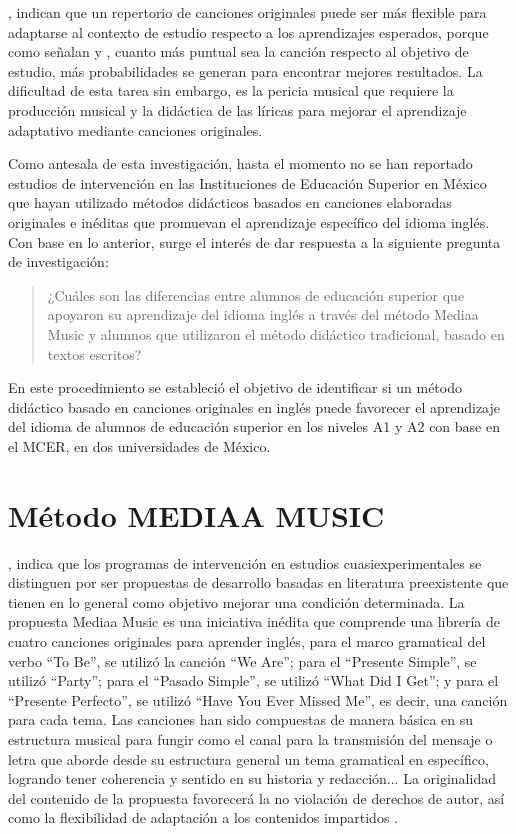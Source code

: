 \documentclass[spanish]{textolivre}
\begin{document}
\textcite{lestari2020vocabulary}, indican que un repertorio de canciones originales puede ser más flexible para adaptarse al contexto de estudio respecto a los aprendizajes esperados, porque como señalan \textcite{hafting2018benefits} y \textcite{hakvoort2022music}, cuanto más puntual sea la canción respecto al objetivo de estudio, más probabilidades se generan para encontrar mejores resultados. La dificultad de esta tarea sin embargo, es la pericia musical que requiere la producción musical y la didáctica de las líricas para mejorar el aprendizaje adaptativo mediante canciones originales.

Como antesala de esta investigación, hasta el momento no se han reportado estudios de intervención en las Instituciones de Educación Superior en México que hayan utilizado métodos didácticos basados en canciones elaboradas originales e inéditas que promuevan el aprendizaje específico del idioma inglés. Con base en lo anterior, surge el interés de dar respuesta a la siguiente pregunta de investigación:

\begin{quote}
 ¿Cuáles son las diferencias entre alumnos de educación superior que apoyaron su aprendizaje del idioma inglés a través del método Mediaa Music y alumnos que utilizaron el método didáctico tradicional, basado en textos escritos?
\end{quote}

En este procedimiento se estableció el objetivo de identificar si un método didáctico basado en canciones originales en inglés puede favorecer el aprendizaje del idioma de alumnos de educación superior en los niveles A1 y A2 con base en el MCER, en dos universidades de México.





\section{Método MEDIAA MUSIC}

\textcite{ledezmaalbarran2013estudios}, indica que los programas de intervención en estudios cuasiexperimentales se distinguen por ser propuestas de desarrollo basadas en literatura preexistente que tienen en lo general como objetivo mejorar una condición determinada. La propuesta Mediaa Music es una iniciativa inédita que comprende una librería de cuatro canciones originales para aprender inglés, para el marco gramatical del verbo “To Be”, se utilizó la canción “We Are”; para el “Presente Simple”, se utilizó “Party”; para el “Pasado Simple”, se utilizó “What Did I Get”; y para el “Presente Perfecto”, se utilizó “Have You Ever Missed Me”, es decir, una canción para cada tema. Las canciones han sido compuestas de manera básica en su estructura musical para fungir como el canal para la transmisión del mensaje o letra que aborde desde su estructura general un tema gramatical en específico, logrando tener coherencia y sentido en su historia y redacción... La originalidad del contenido de la propuesta favorecerá la no violación de derechos de autor, así como la flexibilidad de adaptación a los contenidos impartidos \cite{lestari2020vocabulary}.
\end{document}
